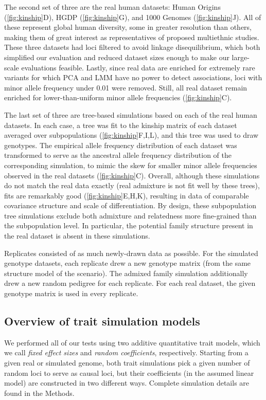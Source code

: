 \documentclass[11pt]{article}
\begin{document}
The second set of three are the real human datasets: Human Origins (\cref{fig:kinship}D), HGDP (\cref{fig:kinship}G), and 1000 Genomes (\cref{fig:kinship}J).
All of these represent global human diversity, some in greater resolution than others, making them of great interest as representatives of proposed multiethnic studies.
These three datasets had loci filtered to avoid linkage disequilibrium, which both simplified our evaluation and reduced dataset sizes enough to make our large-scale evaluations feasible.
Lastly, since real data are enriched for extremely rare variants for which PCA and LMM have no power to detect associations, loci with minor allele frequency under 0.01 were removed.
Still, all real dataset remain enriched for lower-than-uniform minor allele frequencies (\cref{fig:kinship}C).

The last set of three are tree-based simulations based on each of the real human datasets.
In each case, a tree was fit to the kinship matrix of each dataset averaged over subpopulations (\cref{fig:kinship}F,I,L), and this tree was used to draw genotypes.
The empirical allele frequency distribution of each dataset was transformed to serve as the ancestral allele frequency distribution of the corresponding simulation, to mimic the skew for smaller minor allele frequencies observed in the real datasets (\cref{fig:kinship}C).
Overall, although these simulations do not match the real data exactly (real admixture is not fit well by these trees), fits are remarkably good (\cref{fig:kinship}E,H,K), resulting in data of comparable covariance structure and scale of differentiation.
By design, these subpopulation tree simulations exclude both admixture and relatedness more fine-grained than the subpopulation level.
In particular, the potential family structure present in the real dataset is absent in these simulations.

Replicates consisted of as much newly-drawn data as possible.
For the simulated genotype datasets, each replicate drew a new genotype matrix (from the same structure model of the scenario).
The admixed family simulation additionally drew a new random pedigree for each replicate.
For each real dataset, the given genotype matrix is used in every replicate.

\subsection{Overview of trait simulation models}

We performed all of our tests using two additive quantitative trait models, which we call \textit{fixed effect sizes} and \textit{random coefficients}, respectively.
Starting from a given real or simulated genome, both trait simulations pick a given number of random loci to serve as causal loci, but their coefficients (in the assumed linear model) are constructed in two different ways.
Complete simulation details are found in the Methods.
\end{document}
